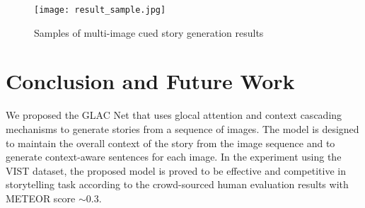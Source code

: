 \documentclass[11pt,a4paper]{article}
\begin{document}
\begin{table}
  \begin{center}
    \caption{Results from experiment settings. Baselines are reported in \cite{huang2016visual}.}
    \label{tab:result}
  \end{center}
\end{table}


\begin{figure}[!h]
\texttt{[image: result\_sample.jpg]}
\caption{Samples of multi-image cued story generation results}
\label{fig:result}
\end{figure}


\section{Conclusion and Future Work}

We proposed the GLAC Net that uses glocal attention and context cascading mechanisms to generate stories from a sequence of images. 
The model is designed to maintain the overall context of the story from the image sequence and to generate context-aware sentences for each image. 
In the experiment using the VIST dataset, the proposed model is proved to be effective and competitive in storytelling task according to the crowd-sourced human evaluation results with METEOR score $\sim$0.3.
\end{document}
